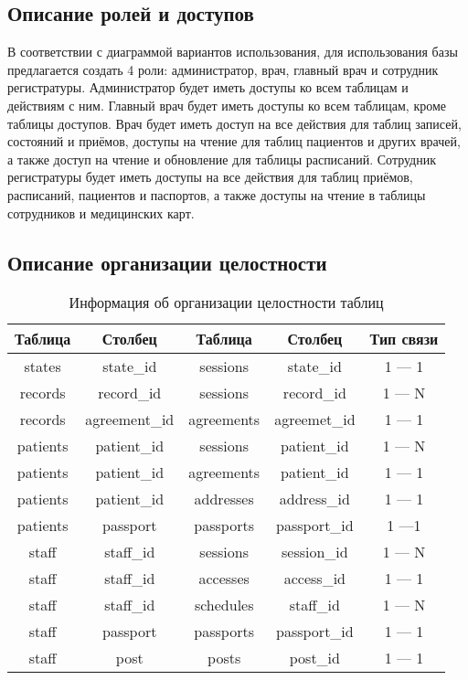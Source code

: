 \subsection{Описание ролей и доступов}

В соответствии с диаграммой вариантов использования, для использования базы предлагается создать 4 роли: администратор, врач, главный врач и сотрудник регистратуры. 
Администратор будет иметь доступы ко всем таблицам и действиям с ним. 
Главный врач будет иметь доступы ко всем таблицам, кроме таблицы доступов.
Врач будет иметь доступ на все действия для таблиц записей, состояний и приёмов, доступы на чтение для таблиц пациентов и других врачей, а также доступ на чтение и обновление для таблицы расписаний.
Сотрудник регистратуры будет иметь доступы на все действия для таблиц приёмов, расписаний, пациентов и паспортов, а также доступы на чтение в таблицы сотрудников и медицинских карт.

\subsection{Описание организации целостности}

\begin{table}[H]
\begin{center}
	\captionsetup{justification=raggedright,singlelinecheck=off,margin=5mm}
	\caption{Информация об организации целостности таблиц}
	\begin{tabular}{| c | c | c | c | c |}
		\hline
		Таблица & Столбец & Таблица & Столбец & Тип связи \\
		\hline
		states & state\_id & sessions & state\_id & 1 --- 1\\
		\hline
		records & record\_id & sessions & record\_id & 1 --- N \\
		\hline
		records &  agreement\_id & agreements & agreemet\_id & 1 --- 1 \\
		\hline
		patients & patient\_id & sessions & patient\_id & 1 --- N \\
		\hline
		patients & patient\_id & agreements & patient\_id & 1 --- 1\\
		\hline
		patients & patient\_id & addresses & address\_id & 1 --- 1 \\
		\hline
		patients & passport & passports & passport\_id & 1 ---1 \\ \hline
		staff & staff\_id & sessions & session\_id & 1 --- N \\
		\hline
		staff  & staff\_id & accesses & access\_id & 1 --- 1\\
		\hline
		staff  & staff\_id & schedules & staff\_id & 1 --- N\\
		\hline
		staff & passport & passports & passport\_id & 1 --- 1 \\
		\hline
		staff & post & posts & post\_id & 1 --- 1 \\ \hline
	\end{tabular}
	\label{table:passports-columns}
\end{center}
\end{table}

